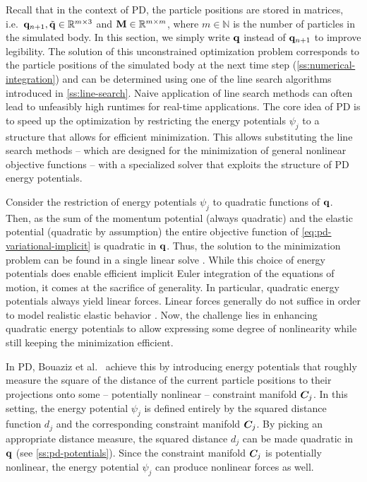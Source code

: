 \noindent Recall that in the context of PD, the particle positions are stored in matrices, i.e.\ $\mathbf{q}_{n+1}, \tilde{\mathbf{q}} \in 
\mathbb{R}^{m \times 3}$ and $\mathbf{M} \in \mathbb{R}^{m \times m}$, where $m \in \mathbb{N}$ is the number of particles in the simulated
body. In this section, we simply write $\mathbf{q}$ instead of $\mathbf{q}_{n+1}$ to improve legibility. The solution of this unconstrained 
optimization problem corresponds to the particle positions of the simulated body at the next time
step (\cref{ss:numerical-integration}) and can be determined using one of the line search algorithms introduced in \cref{ss:line-search}.
Naive application of line search methods can often lead to unfeasibly high runtimes for real-time applications. The core idea of PD
is to speed up the optimization by restricting the energy potentials $\psi_j$ to a structure that allows for efficient minimization.
This allows substituting the line search methods -- which are designed for the minimization of general nonlinear objective functions 
-- with a specialized solver that exploits the structure of PD energy potentials. 

Consider the restriction of energy potentials $\psi_j$ to quadratic functions of $\mathbf{q}$. Then, as the sum of the momentum potential 
(always quadratic) and the elastic potential (quadratic by assumption) the entire objective function of \autoref{eq:pd-variational-implicit} 
is quadratic in $\mathbf{q}$. Thus, the solution to the minimization problem can be found in a single linear solve \cite{nocedal2006}. 
While this choice
of energy potentials does enable efficient implicit Euler integration of the equations of motion, it comes at the sacrifice of generality.
In particular, quadratic energy potentials always yield linear forces. Linear forces generally do not suffice in order to model realistic
elastic behavior \cite{wang2011}. Now, the challenge lies in enhancing quadratic energy potentials to allow expressing some degree
of nonlinearity while still keeping the minimization efficient. 

In PD, Bouaziz et al.\ \cite{bouaziz2014} achieve this by introducing energy potentials that roughly measure the square of the
distance of the current particle positions to their projections onto some -- potentially nonlinear -- constraint manifold $\bm{C}_j$. 
In this setting, the energy potential $\psi_j$ is defined entirely by the squared distance function $d_j$ and the corresponding constraint 
manifold $\bm{C}_j$. By picking an appropriate distance measure, the squared distance $d_j$ can be made quadratic in $\mathbf{q}$ 
(see \cref{ss:pd-potentials}). Since the constraint manifold $\bm{C}_j$ is potentially nonlinear, the energy potential 
$\psi_j$ can produce nonlinear forces as well. 

